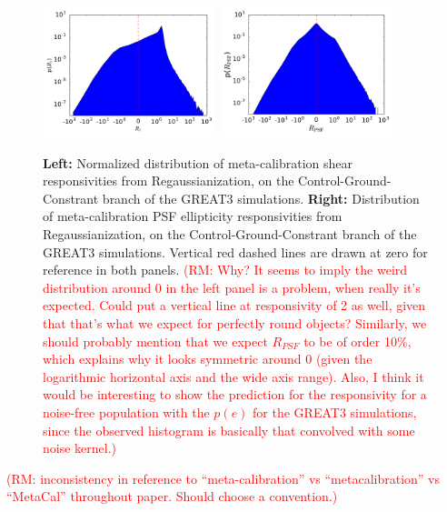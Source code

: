 \documentclass[iop]{emulateapj}
\newcommand\rmcomment[1]{\textcolor{red}{(RM: #1)}}
\begin{document}
\begin{figure}
\begin{center}
\includegraphics[width=0.45\textwidth]{./Plots/R1_hist.pdf}
\includegraphics[width=0.45\textwidth]{./Plots/a1_hist.pdf}
\end{center}
\caption{{\bf Left:} Normalized distribution of meta-calibration shear
  responsivities from Regaussianization, on the
  Control-Ground-Constrant branch of the GREAT3 simulations.  {\bf
    Right:} Distribution of meta-calibration PSF ellipticity
  responsivities from Regaussianization, on the
  Control-Ground-Constrant branch of the GREAT3 simulations. Vertical
  red dashed lines are drawn at zero for reference in both panels. \rmcomment{Why?  It seems to imply
    the weird distribution around 0 in the left panel is a problem, when really it's expected.
    Could put a vertical line at responsivity of 2 as well, given that that's what we expect for
    perfectly round objects?  Similarly, we should probably mention that we expect $R_{PSF}$ to be
    of order 10\%, which explains why it looks symmetric around 0 (given the logarithmic horizontal
    axis and the wide axis range).  Also, I think it would be interesting to show
    the prediction for the responsivity for a noise-free population with the $p(e)$ for the GREAT3
    simulations, since the observed histogram is basically that convolved with some noise kernel.}}
\label{fig:calibhist}
\end{figure}

\rmcomment{inconsistency in reference to ``meta-calibration'' vs ``metacalibration'' vs ``MetaCal'' throughout
  paper.  Should choose a convention.}
\end{document}
